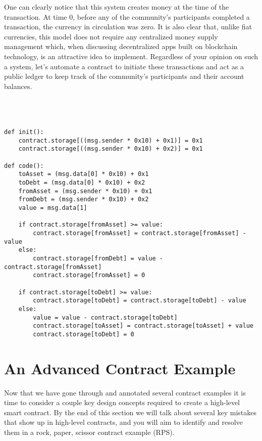 \documentclass[12pt]{article}
\begin{document}
One can clearly notice that this system creates money at the time of the transaction. At time 0, before any of the community's participants completed a transaction, the currency in circulation was zero. It is also clear that, unlike fiat currencies, this model does not require any centralized money supply management which, when discussing decentralized apps built on blockchain technology, is an attractive idea to implement. Regardless of your opinion on such a system, let's automate a contract to initiate these transactions and act as a public ledger to keep track of the community's participants and their account balances. \\
\\
\\
\\
\begin{lstlisting}[frame=single]
def init():
	contract.storage[((msg.sender * 0x10) + 0x1)] = 0x1
	contract.storage[((msg.sender * 0x10) + 0x2)] = 0x1

def code():
	toAsset = (msg.data[0] * 0x10) + 0x1
	toDebt = (msg.data[0] * 0x10) + 0x2
	fromAsset = (msg.sender * 0x10) + 0x1
	fromDebt = (msg.sender * 0x10) + 0x2
	value = msg.data[1]
	
	if contract.storage[fromAsset] >= value:
		contract.storage[fromAsset] = contract.storage[fromAsset] - value 
	else:
		contract.storage[fromDebt] = value - contract.storage[fromAsset]
		contract.storage[fromAsset] = 0
		
	if contract.storage[toDebt] >= value:
		contract.storage[toDebt] = contract.storage[toDebt] - value
	else:
		value = value - contract.storage[toDebt] 
		contract.storage[toAsset] = contract.storage[toAsset] + value
		contract.storage[toDebt] = 0
\end{lstlisting}





\section{An Advanced Contract Example}
Now that we have gone through and annotated several contract examples it is time to consider a couple key design concepts required to create a high-level smart contract. By the end of this section we will talk about several key mistakes that show up in high-level contracts, and you will aim to identify and resolve them in a rock, paper, scissor contract example (RPS).
\end{document}
